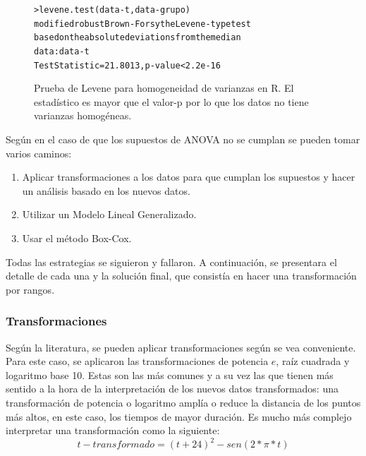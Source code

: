 \begin{figure}[H]
    \centering
        \small{
        \begin{alltt}
        
        
            > levene.test(data-t, data-grupo)
                modified robust Brown-Forsythe Levene-type test 
                based on the absolute deviations from the median
            data:  data-t
            Test Statistic = 21.8013, p-value < 2.2e-16
        \end{alltt}
        }
    \caption{Prueba de Levene para homogeneidad de varianzas en R. El estadístico es mayor que el valor-p por lo que los datos no tiene varianzas homogéneas.}
    \label{fig:levene-t}
\end{figure}




Según \cite{Montgomery2001} en el caso de que los supuestos de ANOVA no se cumplan se pueden tomar varios caminos:
\begin{enumerate}
    \item Aplicar transformaciones a los datos para que cumplan los supuestos y hacer un análisis basado en los nuevos datos.
    \item Utilizar un Modelo Lineal Generalizado.
    \item Usar el método Box-Cox.
    
\end{enumerate}

Todas las estrategias se siguieron y fallaron. A continuación, se presentara el detalle de cada una y la solución final, que consistía en hacer una transformación por rangos\cite{SAS2004}.


\subsubsection{Transformaciones}

Según la literatura, se pueden aplicar transformaciones según se vea conveniente. Para este caso, se aplicaron las transformaciones de potencia $e$, raíz cuadrada y logaritmo base 10. Estas son las más comunes y a su vez las que tienen más sentido a la hora de la interpretación de los nuevos datos transformados: una transformación de potencia o logaritmo amplía o reduce la distancia de los puntos más altos, en este caso, los tiempos de mayor duración. Es mucho más complejo interpretar una transformación como la siguiente:
\begin{equation}
t-transformado = (t + 24)^2 - sen(2*\pi * t)
\end{equation}

